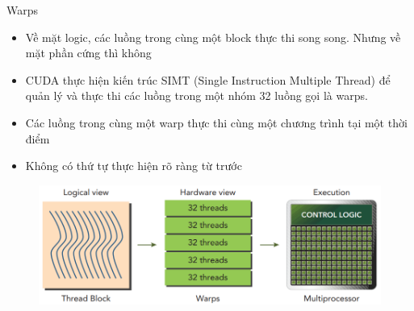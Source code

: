 \documentclass[10pt]{beamer}
\theoremstyle{remark}
\numberwithin{algocf}{section}
\numberwithin{equation}{section}
\numberwithin{dl}{section}
\numberwithin{figure}{section}
\begin{document}
\begin{frame}[shrink]{Warps}
    \begin{itemize}
        \item Về mặt logic, các luồng trong cùng một block thực thi song song. Nhưng về mặt phần cứng thì không
        \item CUDA thực hiện kiến trúc SIMT (Single Instruction Multiple Thread) để quản lý và thực thi các luồng trong một nhóm 32 luồng gọi là warps.
        \item Các luồng trong cùng một warp thực thi cùng một chương trình tại một thời điểm
        \item Không có thứ tự thực hiện rõ ràng từ trước
    \end{itemize}

    \begin{figure}[H]
        \centering
        \includegraphics[width=0.7\linewidth]{figures/CUDA/Logical_view_vs_Hardware_view.png}
    \end{figure}
\end{frame}
\end{document}
